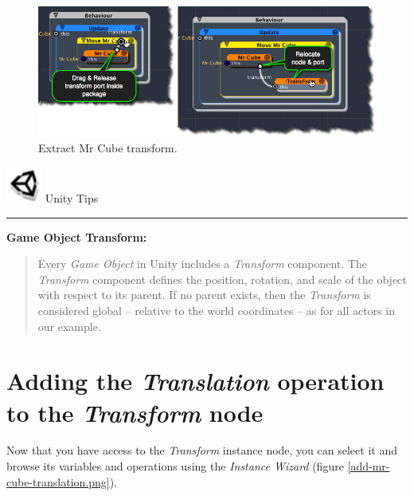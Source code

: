 \begin{figure}[htbp]
\centering
\includegraphics[keepaspectratio,width=\textwidth,height=0.75\textheight]{extract-mr-cube-transform.png}
\caption{Extract Mr Cube transform.}
\label{extract-mr-cube-transform.png}
\end{figure}
\begin{tipbox}

\includegraphics[width=33pt,height=33pt]{UnityLogo_32x32.png} {\Large \color{black} Unity Tips }

\begin{center}\rule{\textwidth}{0.4pt}\end{center}

\textbf{Game Object Transform:}

\begin{quote}

Every \emph{Game Object} in Unity includes a \emph{Transform} component. The \emph{Transform} component defines the position, rotation, and scale of the object with respect to its parent. If no parent exists, then the \emph{Transform} is considered global -- relative to the world coordinates -- as for all actors in our example.
\end{quote}

\end{tipbox}



\section{Adding the \emph{Translation} operation to the \emph{Transform} node}
\label{addingthetranslationoperationtothetransformnode}

Now that you have access to the \emph{Transform} instance node, you can select it and browse its variables and operations using the \emph{Instance Wizard} (figure \ref{add-mr-cube-translation.png}).

